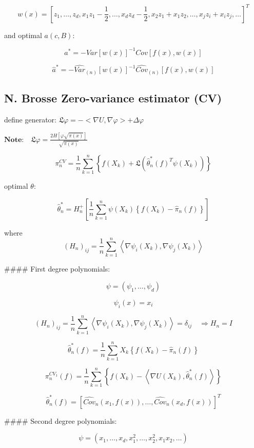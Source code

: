 \documentclass[a4paper]{article}
\begin{document}
$$w(x) = \left[z_1, \dots, z_d, x_1z_1 - \frac{1}{2}, \dots, x_d z_d - \frac{1}{2}, x_2z_1 + x_1z_2, \dots, x_jz_i + x_i z_j, \dots \right]^T $$

and optimal $a (c,B)$:

$$a^* = - Var \left[w(x) \right]^{-1} Cov \left[f(x), w(x) \right]$$

$$\hat{a}^* = - \hat{Var}_{(n)} \left[w(x) \right]^{-1} \hat{Cov}_{(n)} \left[f(x), w(x) \right]$$

\subsection{N. Brosse Zero-variance estimator (CV)}
define generator: $ \mathfrak{L} \varphi = - <\nabla U, \nabla \varphi> + \Delta \varphi$ 

$\textbf{Note:}\quad \mathfrak{L}\varphi = \frac{2H\left[ \varphi \sqrt{\pi(x)}\right]}{\sqrt{\pi(x)}}$

$$\pi_n^{CV} = \frac{1}{n} \sum_{k=1}^n \left\{ f(X_k) + \mathfrak{L} \left( \hat{\theta}^{*}_n(f)^T \psi (X_k)\right)\right\}$$

optimal $\theta$:

$$\hat{\theta}^{*}_n = H_n^{+} \left[ \frac{1}{n} \sum_{k=1}^n\psi(X_k) \left\{ f(X_k) - \hat{\pi}_n(f)\right\} \right]$$

where
$$ (H_n)_{ij} = \frac{1}{n} \sum_{k=1}^n \left< \nabla \psi_i (X_k), \nabla \psi_j (X_k)\right>$$

#### First degree polynomials:

$$\psi = (\psi_1, \dots, \psi_d)$$

$$\psi_i(x) = x_i$$

$$(H_n)_{ij} = \frac{1}{n} \sum_{k=1}^n \left< \nabla \psi_i(X_k), \nabla \psi_j(X_k)\right> = \delta_{ij} \quad \Rightarrow H_n = I$$ 

$$\hat{\theta}^{*}_n (f) = \frac{1}{n} \sum_{k=1}^n X_k \left\{ f(X_k) - \hat{\pi}_n(f)\right\}$$

$$\pi_n^{CV_1} (f) = \frac{1}{n} \sum_{k=1}^n \left\{ f(X_k) - \left< \nabla U(X_k), \hat{\theta}^{*}_n (f)\right>\right\}$$

$$\hat{\theta}^{*}_n (f) = \left[ \hat{Cov}_n(x_1, f(x)), \dots, \hat{Cov}_n(x_d, f(x)) \right]^T$$

#### Second degree polynomials:

$$\psi = \left(x_1, \dots, x_d, x_1^2, \dots, x_2^2, x_1x_2, \dots \right)$$
\end{document}
